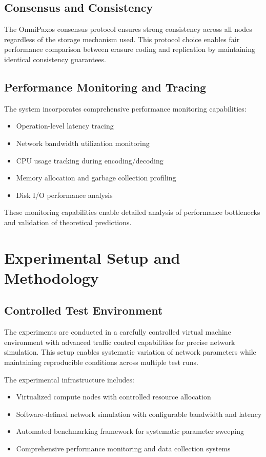 \subsection{Consensus and Consistency}

The OmniPaxos consensus protocol ensures strong consistency across all nodes regardless of the storage mechanism used. This protocol choice enables fair performance comparison between erasure coding and replication by maintaining identical consistency guarantees.

\subsection{Performance Monitoring and Tracing}

The system incorporates comprehensive performance monitoring capabilities:
\begin{itemize}
\item Operation-level latency tracing
\item Network bandwidth utilization monitoring  
\item CPU usage tracking during encoding/decoding
\item Memory allocation and garbage collection profiling
\item Disk I/O performance analysis
\end{itemize}

These monitoring capabilities enable detailed analysis of performance bottlenecks and validation of theoretical predictions.

\section{Experimental Setup and Methodology}

\subsection{Controlled Test Environment}

The experiments are conducted in a carefully controlled virtual machine environment with advanced traffic control capabilities for precise network simulation. This setup enables systematic variation of network parameters while maintaining reproducible conditions across multiple test runs.

The experimental infrastructure includes:
\begin{itemize}
\item Virtualized compute nodes with controlled resource allocation
\item Software-defined network simulation with configurable bandwidth and latency
\item Automated benchmarking framework for systematic parameter sweeping
\item Comprehensive performance monitoring and data collection systems
\end{itemize}

